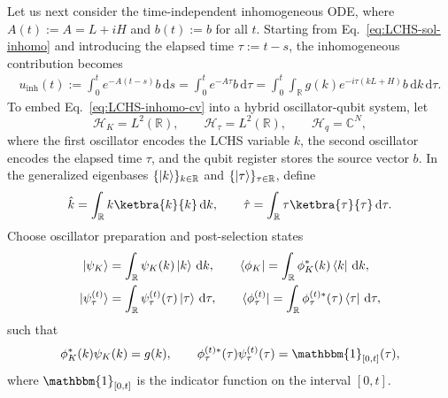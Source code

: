 \documentclass{article}
\newcommand{\dd}{\mathrm{d}}
\newcommand{\Cbb}{\mathbb{C}}
\newcommand{\Rbb}{\mathbb{R}}
\begin{document}
Let us next consider the time-independent inhomogeneous ODE, where $A(t):=A=L+iH$ and $b(t):=b$ for all $t$. Starting from Eq.~\eqref{eq:LCHS-sol-inhomo} and introducing the elapsed time $\tau:=t-s$, the inhomogeneous contribution becomes
\begin{align}
    u_{\mathrm{inh}}(t)
    := \int_0^t e^{-A(t-s)} b \, \dd s
    = \int_0^t e^{-A\tau} b \, \dd \tau
    = \int_0^t \int_\Rbb g(k) e^{-i \tau (kL+H)} b \, \dd k \, \dd \tau .
    \label{eq:LCHS-inhomo-cv}
\end{align}
To embed Eq.~\eqref{eq:LCHS-inhomo-cv} into a hybrid oscillator-qubit system, let
\[
    \mathcal{H}_K = L^2(\Rbb), \qquad
    \mathcal{H}_{\tau} = L^2(\Rbb), \qquad
    \mathcal{H}_q = \Cbb^N,
\]
where the first oscillator encodes the LCHS variable $k$, the second oscillator encodes the elapsed time $\tau$, and the qubit register stores the source vector $b$. In the generalized eigenbases $\{\ket{k}\}_{k \in \Rbb}$ and $\{\ket{\tau}\}_{\tau \in \Rbb}$, define
\begin{align}
    \hat{k} = \int_{\Rbb} k \ketbra{k}{k} \, \dd k, \qquad
    \hat{\tau} = \int_{\Rbb} \tau \ketbra{\tau}{\tau} \, \dd \tau .
\end{align}
Choose oscillator preparation and post-selection states
\begin{align}
    \ket{\psi_K} &= \int_{\Rbb} \psi_K(k)\ket{k}\,\dd k, \qquad
    \bra{\phi_K} = \int_{\Rbb} \phi_K^*(k)\bra{k}\,\dd k, \\
    \ket{\psi_\tau^{(t)}} &= \int_{\Rbb} \psi_\tau^{(t)}(\tau)\ket{\tau}\,\dd \tau, \qquad
    \bra{\phi_\tau^{(t)}} = \int_{\Rbb} \phi_\tau^{(t)*}(\tau)\bra{\tau}\,\dd \tau,
\end{align}
such that
\begin{align}
    \phi_K^*(k)\psi_K(k) = g(k), \qquad
    \phi_\tau^{(t)*}(\tau)\psi_\tau^{(t)}(\tau) = \mathbbm{1}_{[0,t]}(\tau),
\end{align}
where $\mathbbm{1}_{[0,t]}$ is the indicator function on the interval $[0,t]$.
\end{document}
